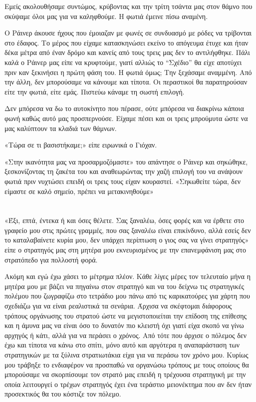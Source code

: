 \documentclass[12pt,twoside, openany]{book}
\begin{document}
Εμείς ακολουθήσαμε συντώμος, κρύβοντας και την τρίτη τσάντα μας στον θάμνο που σκύψαμε όλοι μας για να καληφθούμε. Η φωτιά έμεινε πίσω αναμένη.

Ο Ράινερ άκουσε ήχους που έμοιαζαν με φωνές σε συνδυασμό με ρόδες να τρίβονται στο έδαφος. Το μέρος που είχαμε κατασκηνώσει εκείνο το απόγευμα έτυχε και ήταν δέκα μέτρα από έναν δρόμο και κανείς από τους τρεις μας δεν το αντιλήφθηκε. Πάλι καλά ο Ράινερ μας είπε να κρυφτούμε, γιατί αλλιώς το “Σχέδιο” θα είχε αποτύχει πριν καν ξεκινήσει η πρώτη φάση του. Η φωτιά όμως; Την ξεχάσαμε αναμμένη. Από την άλλη, δεν μπορούσαμε να κάνουμε και τίποτα. Οι περαστικοί θα παρατηρούσαν είτε την φωτιά, είτε εμάς. Πιστεύω κάναμε τη σωστή επιλογή.

Δεν μπόρεσα να δω το αυτοκίνητο που πέρασε, ούτε μπόρεσα να διακρίνω κάποια φωνή καθώς αυτό μας προσπερνούσε. Είχαμε πέσει και οι τρεις μπρούμυτα ώστε να μας καλύπτουν τα κλαδιά των θάμνων.

«Τώρα σε τι βασιστήκαμε;» είπε ειρωνικά ο Γιόχαν.

«Στην ικανότητα μας να προσαρμοζόμαστε» του απάντησε ο Ράινερ και σηκώθηκε, ξεσκονίζοντας τη ζακέτα του και αναθεωρώντας  την χαζή επιλογή του να ανάψουν φωτιά πριν νυχτώσει επειδή οι τρεις τους είχαν κουραστεί. «Σηκωθείτε τώρα, δεν είμαστε σε καλό σημείο, πρέπει να μετακινηθούμε»


\chapter{}

«Έξι, επτά, έντεκα ή και όσες θέλετε. Σας ξαναλέω, όσες φορές και να έρθετε στο γραφείο μου στις πρώτες γραμμές, που σας ξαναλέω είναι επικίνδυνο, αλλά εσείς δεν το καταλαβαίνετε κυρία μου, δεν υπάρχει περίπτωση ο γιος σας να γίνει στρατηγός» είπε ο στρατηγός μας στη μητέρα μου εκνευρισμένος με την επανεμφάνιση μας στο στρατόπεδο για πολλοστή φορά. 

Ακόμη και εγώ έχω χάσει το μέτρημα πλέον. Κάθε λίγες μέρες τον τελευταίο μήνα η μητέρα μου με βάζει να πηγαίνω στον στρατηγό και να του δείχνω τις στρατηγικές πολέμου που ζωγραφίζω στο τετράδιο μου πάνω από τις καρικατούρες για χάρτη που σχεδιάζω για να είναι ρεαλιστικά τα σενάρια. Άρχισα να σκέφτομαι διάφορους τρόπους οργάνωσης του στρατού ώστε να μεγιστοποιείται την επίδοση της επίθεσης και η άμυνα μας να είναι όσο το δυνατόν πιο κλειστή όχι γιατί είχα σκοπό να γίνω αρχηγός ή κάτι, αλλά για να περάσει ο χρόνος. Από τότε που άρχισε ο πόλεμος δεν έχω και τίποτα να κάνω στο σπίτι, μόνο αυτό και αργότερα η αναπαράσταση των στρατηγικών με τα ξύλινα στρατιωτάκια είχα για να περάσω τον χρόνο μου. Κυρίως μου τράβηξε το ενδιαφέρον να προσπαθώ να οργανώσω τρόπους με τους οποίους θα μπορούσαμε να σκορπίσουμε τον στρατό μας επειδή η τρέχουσα στρατηγική με την οποία λειτουργεί ο τρέχων στρατηγός έχει ένα τεράστιο μειονέκτημα που αν δεν ήταν προσεκτικός θα του κόστιζε τον πόλεμο.
\end{document}
